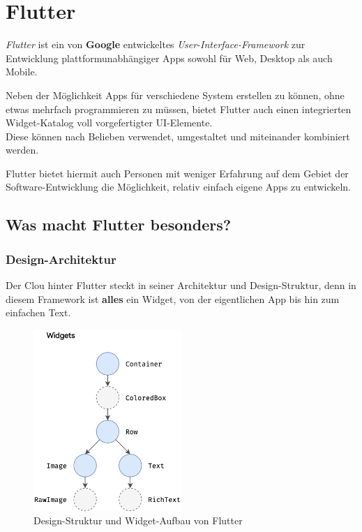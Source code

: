 \section{Flutter}

\textit{Flutter} ist ein von \textbf{Google} entwickeltes \textit{User-Interface-Framework} zur
Entwicklung plattformunabhängiger Apps sowohl für Web, Desktop als auch Mobile.

Neben der Möglichkeit Apps für verschiedene System erstellen zu können, ohne etwas mehrfach programmieren
zu müssen, bietet Flutter auch einen integrierten Widget-Katalog voll vorgefertigter UI-Elemente.\\
Diese können nach Belieben verwendet, umgestaltet und miteinander kombiniert werden.

Flutter bietet hiermit auch Personen mit weniger Erfahrung auf dem Gebiet der Software-Entwicklung
die Möglichkeit, relativ einfach eigene Apps zu entwickeln.

\subsection{Was macht Flutter besonders?}

\subsubsection{Design-Architektur}

Der Clou hinter Flutter steckt in seiner Architektur und Design-Struktur, denn in diesem Framework ist \textbf{alles} ein Widget,
von der eigentlichen App bis hin zum einfachen Text.

\begin{figure}[H]
    \begin{center}
        \includegraphics[width=0.5\textwidth]{images/Flutter/design-structure.png}
        \caption{Design-Struktur und Widget-Aufbau von Flutter}
    \end{center}
\end{figure}


